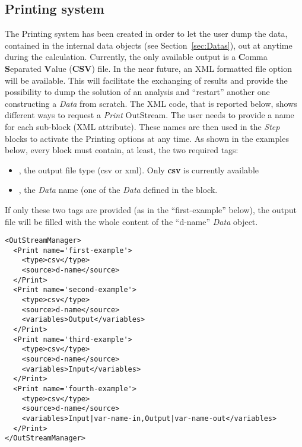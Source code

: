 \subsection{Printing system \label{sec:printing}}
The Printing system has been created in order to let the user dump the data,
contained in the internal data objects (see Section~\ref{sec:Datas}), out
at anytime during the calculation.
%
Currently, the only available output is a \textbf{C}omma \textbf{S}eparated
\textbf{V}alue (\textbf{CSV}) file.
%
In the near future, an XML formatted file option will be available.
%
This will facilitate the exchanging of results and provide the possibility to
dump the solution of an analysis and ``restart'' another one constructing a
\textit{Data} from scratch.
%
The XML code, that is reported below, shows different ways to request a
\textit{Print} OutStream.
%
The user needs to provide a name for each sub-block (XML attribute).
%
These names are then used in the \textit{Step} blocks to activate the Printing
options at any time.
%
As shown in the examples below, every  block must contain, at
least, the two required tags:
\vspace{-5mm}
\begin{itemize}
  \itemsep0em
  \item {}, the output file type (csv or xml).
  \nb Only \textbf{csv} is currently available
  \item {}, the \textit{Data} name (one of the \textit{Data} 
  defined in the  block.
\end{itemize}
\vspace{-5mm}
If only these two tags are provided (as in the ``first-example'' below), the
output file will be filled with the whole content of the ``d-name''
\textit{Data} object.
%
\begin{lstlisting}[style=XML]
<OutStreamManager>
  <Print name='first-example'>
    <type>csv</type>
    <source>d-name</source>
  </Print>
  <Print name='second-example'>
    <type>csv</type>
    <source>d-name</source>
    <variables>Output</variables>
  </Print>
  <Print name='third-example'>
    <type>csv</type>
    <source>d-name</source>
    <variables>Input</variables>
  </Print>
  <Print name='fourth-example'>
    <type>csv</type>
    <source>d-name</source>
    <variables>Input|var-name-in,Output|var-name-out</variables>
  </Print>
</OutStreamManager>
\end{lstlisting}

